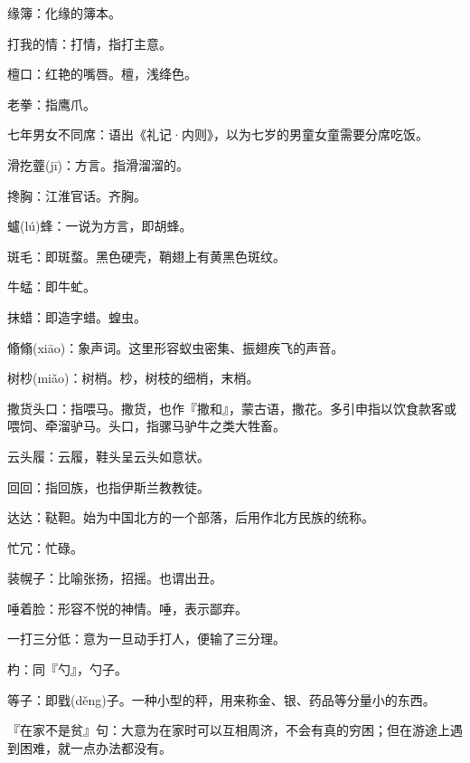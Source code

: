 \startbuffer[1999]
缘簿：化缘的簿本。
\stopbuffer


\startbuffer[2000]
打我的情：打情，指打主意。
\stopbuffer


\startbuffer[2001]
檀口：红艳的嘴唇。檀，浅绛色。
\stopbuffer


\startbuffer[2002]
老拳：指鹰爪。
\stopbuffer


\startbuffer[2003]
七年男女不同席：语出《礼记·内则》，以为七岁的男童女童需要分席吃饭。
\stopbuffer


\startbuffer[2004]
滑扢虀(jī)：方言。指滑溜溜的。
\stopbuffer


\startbuffer[2005]
搀胸：江淮官话。齐胸。
\stopbuffer


\startbuffer[2006]
蠦(lú)蜂：一说为方言，即胡蜂。
\stopbuffer


\startbuffer[2007]
斑毛：即斑蝥。黑色硬壳，鞘翅上有黄黑色斑纹。
\stopbuffer


\startbuffer[2008]
牛蜢：即牛虻。
\stopbuffer


\startbuffer[2009]
抹蜡：即造字蜡。蝗虫。
\stopbuffer


\startbuffer[2010]
翛翛(xiāo)：象声词。这里形容蚁虫密集、振翅疾飞的声音。
\stopbuffer


\startbuffer[2011]
树杪(miǎo)：树梢。杪，树枝的细梢，末梢。
\stopbuffer


\startbuffer[2012]
撒货头口：指喂马。撒货，也作『撒和』，蒙古语，撒花。多引申指以饮食款客或喂饲、牵溜驴马。头口，指骡马驴牛之类大牲畜。
\stopbuffer


\startbuffer[2013]
云头履：云履，鞋头呈云头如意状。
\stopbuffer


\startbuffer[2014]
回回：指回族，也指伊斯兰教教徒。
\stopbuffer


\startbuffer[2015]
达达：鞑靼。始为中国北方的一个部落，后用作北方民族的统称。
\stopbuffer


\startbuffer[2016]
忙冗：忙碌。
\stopbuffer


\startbuffer[2017]
装幌子：比喻张扬，招摇。也谓出丑。
\stopbuffer


\startbuffer[2018]
唾着脸：形容不悦的神情。唾，表示鄙弃。
\stopbuffer


\startbuffer[2019]
一打三分低：意为一旦动手打人，便输了三分理。
\stopbuffer


\startbuffer[2020]
杓：同『勺』，勺子。
\stopbuffer


\startbuffer[2021]
等子：即戥(děng)子。一种小型的秤，用来称金、银、药品等分量小的东西。
\stopbuffer


\startbuffer[2022]
『在家不是贫』句：大意为在家时可以互相周济，不会有真的穷困；但在游途上遇到困难，就一点办法都没有。
\stopbuffer


